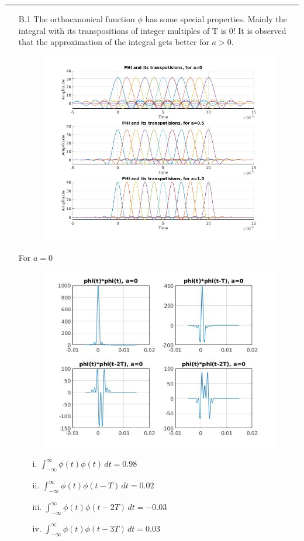 \documentclass[12pt, a4paper]{article}
\begin{document}
\noindent\rule{\textwidth}{.5pt}
\pagebreak
\begin{enumerate}

\item[B.1] The orthocanonical function $\phi$ has some special properties. Mainly the integral with its transpositions of integer multiples of T is 0!
It is observed that the approximation of the integral gets better for $a>0$.
\begin{figure}[H]
\centering
\noindent\includegraphics[width=\textwidth]{phi_k_all.jpg}
\end{figure}

\pagebreak
For $a=0$
\begin{figure}[H]
\centering
\noindent\includegraphics[width=\textwidth]{phi_k_a1.jpg}
\end{figure}
\begin{enumerate}
\item[i.] $\int_{-\infty}^{\infty} \phi(t)\phi(t) \,dt = 0.98$
\item[ii.] $\int_{-\infty}^{\infty} \phi(t)\phi(t-T) \,dt = 0.02$
\item[iii.] $\int_{-\infty}^{\infty} \phi(t)\phi(t-2T) \,dt = -0.03$
\item[iv.] $\int_{-\infty}^{\infty} \phi(t)\phi(t-3T) \,dt = 0.03$
\end{enumerate}


\end{enumerate}
\end{document}
